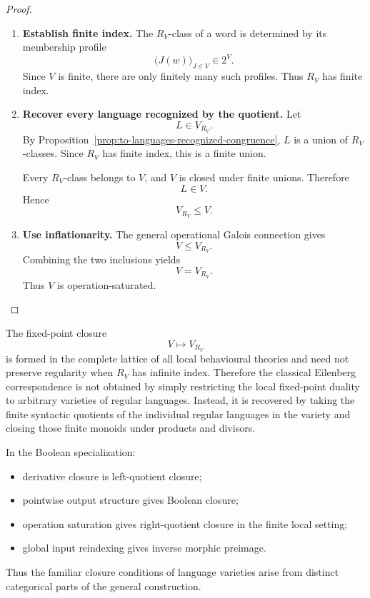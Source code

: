 \begin{proof}
\begin{enumerate}
        \item \textbf{Establish finite index.}
        The \(R_V\)-class of a word is determined by its membership profile
        \[
            \bigl(J(w)\bigr)_{J\in V}\in 2^V.
        \]
        Since \(V\) is finite, there are only finitely many such profiles.
        Thus \(R_V\) has finite index.

        \item \textbf{Recover every language recognized by the quotient.}
        Let
        \[
            L\in V_{R_V}.
        \]
        By
        Proposition~\ref{prop:to-languages-recognized-congruence},
        \(L\) is a union of \(R_V\)-classes. Since \(R_V\) has finite index,
        this is a finite union.

        Every \(R_V\)-class belongs to \(V\), and \(V\) is closed under finite
        unions. Therefore
        \[
            L\in V.
        \]
        Hence
        \[
            V_{R_V}\leq V.
        \]

        \item \textbf{Use inflationarity.}
        The general operational Galois connection gives
        \[
            V\leq V_{R_V}.
        \]
        Combining the two inclusions yields
        \[
            V=V_{R_V}.
        \]
        Thus \(V\) is operation-saturated.
    \end{enumerate}
\end{proof}

\begin{remark}
\label{rem:to-regularity-operation-saturation}
    The fixed-point closure
    \[
        V\longmapsto V_{R_V}
    \]
    is formed in the complete lattice of all local behavioural theories and
    need not preserve regularity when \(R_V\) has infinite index. Therefore
    the classical Eilenberg correspondence is not obtained by simply
    restricting the local fixed-point duality to arbitrary varieties of
    regular languages. Instead, it is recovered by taking the finite
    syntactic quotients of the individual regular languages in the variety
    and closing those finite monoids under products and divisors.
\end{remark}

\begin{remark}
\label{rem:to-classical-closure-origins}
    In the Boolean specialization:
    \begin{itemize}
        \item derivative closure is left-quotient closure;
        \item pointwise output structure gives Boolean closure;
        \item operation saturation gives right-quotient closure in the finite
        local setting;
        \item global input reindexing gives inverse morphic preimage.
    \end{itemize}
    Thus the familiar closure conditions of language varieties arise from
    distinct categorical parts of the general construction.
\end{remark}

